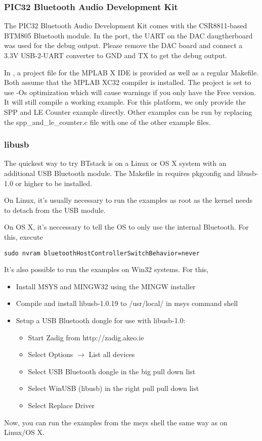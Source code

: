 \subsubsection{PIC32 Bluetooth Audio Development Kit}
The PIC32 Bluetooth Audio Development Kit comes with the CSR8811-based BTM805 Bluetooth module. In the port, the UART on the DAC daugtherboard was used for the debug output. Please remove the DAC board and connect a 3.3V USB-2-UART converter to GND and TX to get the debug output.

In , a project file for the MPLAB X IDE is provided as well as a regular Makefile. Both assume that the MPLAB XC32 compiler is installed. The project is set to use -Os optimization which will cause warnings if you only have the Free version. It will still compile a working example. For this platform, we only provide the SPP and LE Counter example directly. Other examples can be run by replacing the spp\_and\_le\_counter.c file with one of the other example files.

\subsubsection{libusb}
The quickest way to try BTstack is on a Linux or OS X system with an additional USB Bluetooth module. The Makefile in 
requires pkgconfig and libusb-1.0 or higher to be installed. 

On Linux, it's usually necessary to run the examples as root as the kernel needs to detach from the USB module.

On OS X, it's neccessary to tell the OS to only use the internal Bluetooth. For this, execute
\begin{lstlisting}
sudo nvram bluetoothHostControllerSwitchBehavior=never
\end{lstlisting}

It's also possible to run the examples on Win32 systems. For this, 
\begin{itemize}
\item Install MSYS and MINGW32 using the MINGW installer
\item Compile and install libusb-1.0.19 to /usr/local/ in msys command shell
\item Setup a USB Bluetooth dongle for use with libusb-1.0:
	\begin{itemize}
	\item Start Zadig from http://zadig.akeo.ie
	\item Select Options $\rightarrow$ List all devices
	\item Select USB Bluetooth dongle in the big pull down list
	\item Select WinUSB (libusb) in the right pull pull down list
	\item Select Replace Driver
	\end{itemize}
\end{itemize}
Now, you can run the examples from the msys shell the same way as on Linux/OS X.


